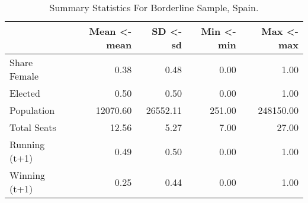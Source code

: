 \begin{table}

\caption{Summary Statistics For Borderline Sample, Spain.}
\centering
\begin{tabular}[t]{lrrrr}
\toprule
  & Mean <- mean & SD <- sd & Min <- min & Max <- max\\
\midrule
Share Female & 0.38 & 0.48 & 0.00 & 1.00\\
Elected & 0.50 & 0.50 & 0.00 & 1.00\\
Population & 12070.60 & 26552.11 & 251.00 & 248150.00\\
Total Seats & 12.56 & 5.27 & 7.00 & 27.00\\
Running (t+1) & 0.49 & 0.50 & 0.00 & 1.00\\
Winning (t+1) & 0.25 & 0.44 & 0.00 & 1.00\\
\bottomrule
\end{tabular}
\end{table}
